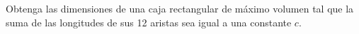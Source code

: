 \item Obtenga las dimensiones de una caja rectangular de máximo volumen tal que la suma de las longitudes de sus 12 aristas sea igual a una constante $c$.
